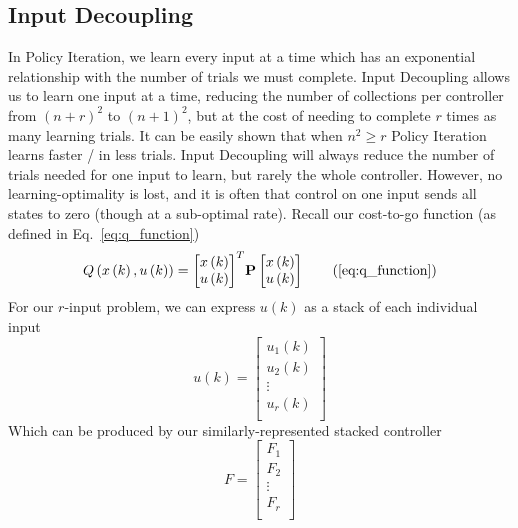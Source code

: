 \FloatBarrier\subsection{Input Decoupling} %
In Policy Iteration, we learn every input at a time which has an exponential relationship with the number of trials we must complete. Input Decoupling allows us to learn one input at a time, reducing the number of collections per controller from ${\left(n+r\right)}^2$ to ${\left(n+1\right)}^2$, but at the cost of needing to complete $r$ times as many learning trials. It can be easily shown that when $n^2\geq r$ Policy Iteration learns faster / in less trials. Input Decoupling will always reduce the number of trials needed for one input to learn, but rarely the whole controller. However, no learning-optimality is lost, and it is often that control on one input sends all states to zero (though at a sub-optimal rate). Recall our cost-to-go function (as defined in Eq.~\ref{eq:q_function})
\begin{equation}
    Q\left(x\left(k\right),u\left(k\right)\right)={\left[\begin{matrix}x\left(k\right)\\u\left(k\right)\\\end{matrix}\right]}^T\textbf{P}\left[\begin{matrix}x\left(k\right)\\u\left(k\right)\\\end{matrix}\right] 
    \tag{\ref{eq:q_function}}
\end{equation}
For our $r$-input problem, we can express $u\left(k\right)$ as a stack of each individual input
\begin{equation}
    u\left(k\right)=\left[\begin{matrix}u_1\left(k\right)\\u_2\left(k\right)\\\vdots\\u_r\left(k\right)\\\end{matrix}\right]
    \label{eq:stacked_inputs}
\end{equation}
Which can be produced by our similarly-represented stacked controller
\begin{equation}
    F=\left[\begin{matrix}F_1\\F_2\\\vdots\\F_r\\\end{matrix}\right]
    \label{eq:stacked_controllers}
\end{equation}

